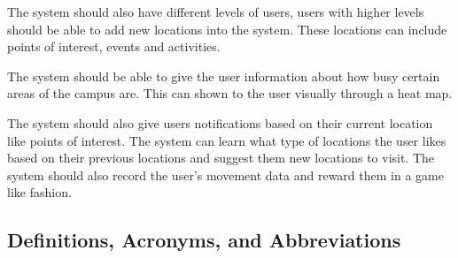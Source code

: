 \documentclass[11pt]{article}
\begin{document}
	The system should also have different levels of users, users with higher levels should be able to add new locations into the system. These locations can include points of interest, events and activities.
	
	The system should be able to give the user information about how busy certain areas of the campus are. This can shown to the user visually through a heat map.
	
	The system should also give users notifications based on their current location like points of interest. The system can learn what type of locations the user likes based on their previous locations and suggest them new locations to visit. The system should also record the user's movement data and reward them in a game like fashion. 
	
	\subsection{Definitions, Acronyms, and Abbreviations}
\end{document}
